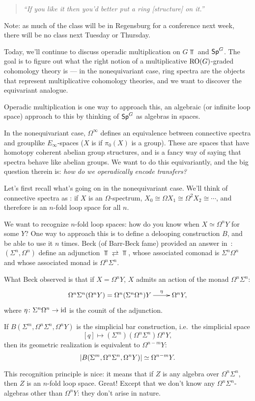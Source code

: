 \begin{quote}\textit{
	``If you like it then you'd better put a ring [structure] on it.''
}\end{quote}
Note: as much of the class will be in Regensburg for a conference next week, there will be no class next Tuesday or
Thursday.

Today, we'll continue to discuss operadic multiplication on $G\Top$ and $\mathsf{Sp}^G$. The goal is to figure out what
the right notion of a multiplicative $\mathrm{RO}(G)$-graded cohomology theory is --- in the nonequivariant case, ring
spectra are the objects that represent multiplicative cohomology theories, and we want to discover the equivariant
analogue.

Operadic multiplication is one way to approach this, an algebraic (or infinite loop space) approach to this by
thinking of $\mathsf{Sp}^G$ as algebras in spaces.

In the nonequivariant case, $\Omega^\infty$ defines an equivalence between connective spectra and grouplike
$E_\infty$-spaces ($X$ is  if $\pi_0(X)$ is a group). These are spaces that have homotopy coherent
abelian group structures, and is a fancy way of saying that spectra behave like abelian groups. We want to do this
equivariantly, and the big question therein is: \emph{how do we operadically encode transfers?}

Let's first recall what's going on in the nonequivariant case. We'll think of connective spectra as : if $X$ is an $\Omega$-spectrum, $X_0 \cong \Omega X_1 \cong \Omega^2 X_2 \cong \dotsb$, and therefore
is an $n$-fold loop space for all $n$.

We want to recognize $n$-fold loop spaces: how do you know when $X\simeq\Omega^n Y$ for some $Y$? One way to
approach this is to define a delooping construction $B$, and be able to use it $n$ times. Beck (of Barr-Beck fame)
provided an answer in~\cite{Beck}: $(\Sigma^n, \Omega^n)$ define an adjunction $\Top\rightleftarrows\Top$, whose
associated comonad is $\Sigma^n\Omega^n$ and whose associated monad is $\Omega^n\Sigma^n$.

What Beck observed is that if $X = \Omega^n Y$, $X$ admits an action of the monad $\Omega^n\Sigma^n$:
\[\xymatrix{
	\Omega^n\Sigma^n (\Omega^n Y) = \Omega^n (\Sigma^n\Omega^n) Y\ar[r]^-\eta &\Omega^n Y,
}\]
where $\eta\colon\Sigma^n\Omega^n\to\mathrm{id}$ is the counit of the adjunction.
\begin{thm}
If $B(\Sigma^m, \Omega^n\Sigma^n, \Omega^n Y)$ is the simplicial bar construction, i.e.\ the simplicial space
\[[q]\mapsto (\Sigma^m)(\Omega^n\Sigma^n)\Omega^n Y,\]
then its geometric realization is equivalent to $\Omega^{n-m}Y$:
\[\lvert B(\Sigma^m, \Omega^n\Sigma^n, \Omega^n Y)\rvert\simeq \Omega^{n-m}Y.\]
\end{thm}
This recognition principle is nice: it means that if $Z$ is any algebra over $\Omega^n\Sigma^n$, then $Z$ is an
$n$-fold loop space. Great! Except that we don't know any $\Omega^n\Sigma^n$-algebras other than $\Omega^n Y$: they
don't arise in nature.

